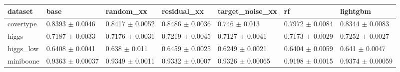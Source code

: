 \begin{tabular}{lllllll}
\toprule
dataset & base & random\_xx & residual\_xx & target\_noise\_xx & rf & lightgbm \\
\midrule
covertype & 0.8393 $\pm$ 0.0046 & 0.8417 $\pm$ 0.0052 & 0.8486 $\pm$ 0.0036 & 0.746 $\pm$ 0.013 & 0.7972 $\pm$ 0.0084 & 0.8344 $\pm$ 0.0083 \\
higgs & 0.7187 $\pm$ 0.0033 & 0.7176 $\pm$ 0.0031 & 0.7219 $\pm$ 0.0045 & 0.7127 $\pm$ 0.0041 & 0.7173 $\pm$ 0.0029 & 0.7252 $\pm$ 0.0027 \\
higgs\_low & 0.6408 $\pm$ 0.0041 & 0.638 $\pm$ 0.011 & 0.6459 $\pm$ 0.0025 & 0.6249 $\pm$ 0.0021 & 0.6404 $\pm$ 0.0059 & 0.641 $\pm$ 0.0047 \\
miniboone & 0.9363 $\pm$ 0.00037 & 0.9349 $\pm$ 0.0011 & 0.9332 $\pm$ 0.0007 & 0.9326 $\pm$ 0.00065 & 0.9198 $\pm$ 0.0015 & 0.9374 $\pm$ 0.00059 \\
\bottomrule
\end{tabular}
